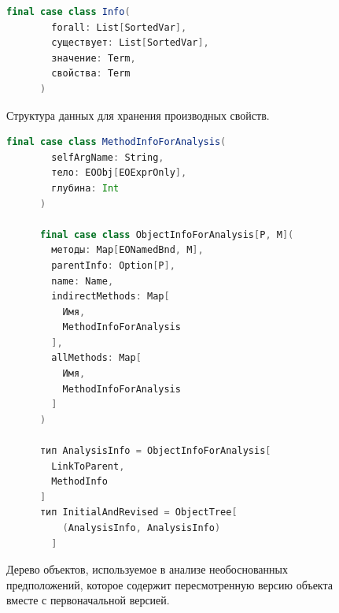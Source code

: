 \begin{figure}
    \begin{lstlisting}[language=Scala]
      final case class Info(
        forall: List[SortedVar],
        существует: List[SortedVar],
        значение: Term,
        свойства: Term
      )
    \end{lstlisting}
    \caption{Структура данных для хранения производных свойств.}
    \label{fig:property_structure}
    \end{figure}
    
    \begin{figure}
    \begin{lstlisting}[language=Scala]
      final case class MethodInfoForAnalysis(
        selfArgName: String,
        тело: EOObj[EOExprOnly],
        глубина: Int
      )
    
      final case class ObjectInfoForAnalysis[P, M](
        методы: Map[EONamedBnd, M],
        parentInfo: Option[P],
        name: Name,
        indirectMethods: Map[
          Имя, 
          MethodInfoForAnalysis
        ],
        allMethods: Map[
          Имя, 
          MethodInfoForAnalysis
        ]
      )
    
      тип AnalysisInfo = ObjectInfoForAnalysis[
        LinkToParent,
        MethodInfo
      ]
      тип InitialAndRevised = ObjectTree[
          (AnalysisInfo, AnalysisInfo)
        ]
    \end{lstlisting}
    \caption{Дерево объектов, используемое в анализе необоснованных предположений, которое содержит пересмотренную версию объекта вместе с первоначальной версией.}
    \label{fig:zipwithinlined}
    \end{figure}
    